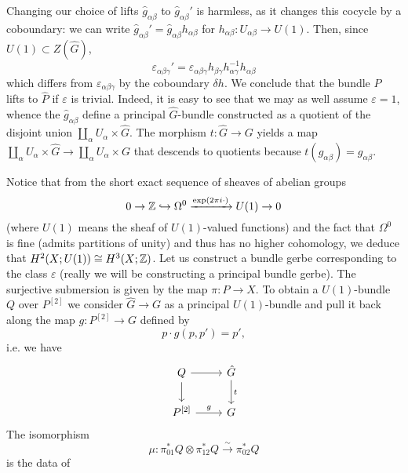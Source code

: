 \documentclass{amsart}
\begin{document}
\begin{example}
    Changing our choice of lifts $\hat g_{\alpha\beta}$ to $\hat g_{\alpha\beta}'$ is harmless,
    as it changes this cocycle by a coboundary: we can write $\hat g_{\alpha\beta}'=\hat g_{\alpha\beta}h_{\alpha\beta}$
    for $h_{\alpha\beta}:U_{\alpha\beta}\to U(1)$. Then, since $U(1)\subset Z(\hat G)$,
    \begin{equation*}
        \varepsilon_{\alpha\beta\gamma}' = \varepsilon_{\alpha\beta\gamma}h_{\beta\gamma}h^{-1}_{\alpha\gamma}h_{\alpha\beta}
    \end{equation*}
    which differs from $\varepsilon_{\alpha\beta\gamma}$ by the coboundary $\delta h$.
    We conclude that the bundle $P$ lifts to $\hat P$ if $\varepsilon$ is trivial. Indeed,
    it is easy to see that we may as well assume $\varepsilon=1$, whence the $\hat g_{\alpha\beta}$
    define a principal $\hat G$-bundle constructed as a quotient of the disjoint union
    $\coprod_\alpha U_\alpha\times \hat G$. The morphism $t:\hat G\to G$ yields a map
    $\coprod_\alpha U_\alpha\times \hat G\to\coprod_\alpha U_\alpha\times G$ that descends
    to quotients because $t(\hat g_{\alpha\beta})=g_{\alpha\beta}$.

    Notice that from the short exact sequence of sheaves of abelian groups
    \begin{equation*}
        0\to \mathbb{Z} \hookrightarrow \Omega^0 \xrightarrow{\exp(2\pi i\cdot)} U(1) \to 0
    \end{equation*}
    (where $U(1)$ means the sheaf of $U(1)$-valued functions) and the fact that $\Omega^0$
    is fine (admits partitions of unity) and thus has no higher cohomology, we deduce
    that $H^2(X;U(1))\cong H^3(X;\mathbb{Z})$. Let us construct a bundle gerbe corresponding to
    the class $\varepsilon$ (really we will be constructing a principal bundle gerbe).
    The surjective submersion is given by the map $\pi:P\to X$. To obtain a $U(1)$-bundle
    $Q$ over $P^{[2]}$ we consider $\hat G\to G$ as a principal $U(1)$-bundle and pull it back
    along the map $g:P^{[2]}\to G$ defined by
    \begin{equation*}
        p\cdot g(p,p')= p',
    \end{equation*}
    i.e. we have
    \begin{equation*}
        \begin{tikzcd}
            Q \rar\dar &  \hat G\dar{t} \\
            P^{[2]} \rar{g} & G
        \end{tikzcd}
    \end{equation*}
    The isomorphism
    \begin{equation*}
        \mu: \pi_{01}^*Q\otimes \pi_{12}^*Q \xrightarrow{\sim} \pi_{02}^*Q
    \end{equation*}
    is the data of  
\end{example}
\end{document}
